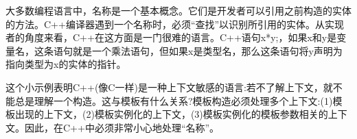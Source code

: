 大多数编程语言中，名称是一个基本概念。它们是开发者可以引用之前构造的实体的方法。C++编译器遇到一个名称时，必须“查找”以识别所引用的实体。从实现者的角度来看，C++在这方面是一门很难的语言。C++语句x*y;，如果x和y是变量名，这条语句就是一个乘法语句，但如果x是类型名，那么这条语句将y声明为指向类型为x的实体的指针。

这个小示例表明C++(像C一样)是一种上下文敏感的语言:若不了解上下文，就不能总是理解一个构造。这与模板有什么关系?模板构造必须处理多个上下文:(1)模板出现的上下文，(2)模板实例化的上下文，(3)模板实例化的模板参数相关的上下文。因此，在C++中必须非常小心地处理“名称”。